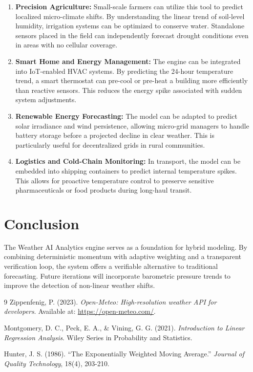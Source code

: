 \documentclass[14pt]{extarticle}
\begin{document}
\begin{enumerate}
    \item \textbf{Precision Agriculture:} Small-scale farmers can utilize this tool to predict localized micro-climate shifts. By understanding the linear trend of soil-level humidity, irrigation systems can be optimized to conserve water. Standalone sensors placed in the field can independently forecast drought conditions even in areas with no cellular coverage.
    \item \textbf{Smart Home and Energy Management:} The engine can be integrated into IoT-enabled HVAC systems. By predicting the 24-hour temperature trend, a smart thermostat can pre-cool or pre-heat a building more efficiently than reactive sensors. This reduces the energy spike associated with sudden system adjustments.
    \item \textbf{Renewable Energy Forecasting:} The model can be adapted to predict solar irradiance and wind persistence, allowing micro-grid managers to handle battery storage before a projected decline in clear weather. This is particularly useful for decentralized grids in rural communities.
    \item \textbf{Logistics and Cold-Chain Monitoring:} In transport, the model can be embedded into shipping containers to predict internal temperature spikes. This allows for proactive temperature control to preserve sensitive pharmaceuticals or food products during long-haul transit.
\end{enumerate}

\section{Conclusion}
The Weather AI Analytics engine serves as a foundation for hybrid modeling. By combining deterministic momentum with adaptive weighting and a transparent verification loop, the system offers a verifiable alternative to traditional forecasting. Future iterations will incorporate barometric pressure trends to improve the detection of non-linear weather shifts.

\begin{thebibliography}{9}
Zippenfenig, P. (2023). \textit{Open-Meteo: High-resolution weather API for developers}. Available at: \url{https://open-meteo.com/}.

Montgomery, D. C., Peck, E. A., \& Vining, G. G. (2021). \textit{Introduction to Linear Regression Analysis}. Wiley Series in Probability and Statistics.

Hunter, J. S. (1986). ``The Exponentially Weighted Moving Average.'' \textit{Journal of Quality Technology}, 18(4), 203-210.
\end{thebibliography}
\end{document}
